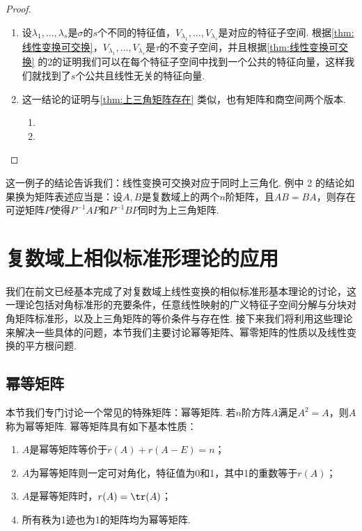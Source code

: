 \begin{proof}
    \begin{enumerate}
        \item 设$\lambda_1,\ldots,\lambda_s$是$\sigma$的$s$个不同的特征值，$V_{\lambda_1},\ldots,V_{\lambda_s}$是对应的特征子空间. 根据\autoref{thm:线性变换可交换}，$V_{\lambda_1},\ldots,V_{\lambda_s}$是$\tau$的不变子空间，并且根据\autoref{thm:线性变换可交换} 的2的证明我们可以在每个特征子空间中找到一个公共的特征向量，这样我们就找到了$s$个公共且线性无关的特征向量.

        \item 这一结论的证明与\autoref{thm:上三角矩阵存在} 类似，也有矩阵和商空间两个版本.
              \begin{enumerate}
                  \item
                  \item
              \end{enumerate}
    \end{enumerate}
\end{proof}

这一例子的结论告诉我们：线性变换可交换对应于同时上三角化. 例中 2 的结论如果换为矩阵表述应当是：设$A,B$是复数域上的两个$n$阶矩阵，且$AB=BA$，则存在可逆矩阵$P$使得$P^{-1}AP$和$P^{-1}BP$同时为上三角矩阵.

\section{复数域上相似标准形理论的应用}

我们在前文已经基本完成了对复数域上线性变换的相似标准形基本理论的讨论，这一理论包括对角标准形的充要条件，任意线性映射的广义特征子空间分解与分块对角矩阵标准形，以及上三角矩阵的等价条件与存在性. 接下来我们将利用这些理论来解决一些具体的问题，本节我们主要讨论幂等矩阵、幂零矩阵的性质以及线性变换的平方根问题.

\subsection{幂等矩阵}

本节我们专门讨论一个常见的特殊矩阵：幂等矩阵. 若$n$阶方阵$A$满足$A^2=A$，则$A$称为幂等矩阵. 幂等矩阵具有如下基本性质：
\begin{enumerate}
    \item $A$是幂等矩阵等价于$r(A)+r(A-E)=n$；

    \item $A$为幂等矩阵则一定可对角化，特征值为0和1，其中1的重数等于$r(A)$；

    \item $A$是幂等矩阵时，$r(A)=\tr(A)$；

    \item 所有秩为1迹也为1的矩阵均为幂等矩阵.
\end{enumerate}

